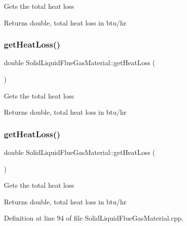 Gets the total heat loss \begin{DoxyReturn}{Returns}
double, total heat loss in btu/hr 
\end{DoxyReturn}
\mbox{\label{class_solid_liquid_flue_gas_material_af7d36673e49f9b5eb631fc04227883d6}} 
\subsubsection{\texorpdfstring{get\+Heat\+Loss()}{getHeatLoss()}\hspace{0.1cm}{\footnotesize\ttfamily [2/3]}}
{\footnotesize\ttfamily double Solid\+Liquid\+Flue\+Gas\+Material\+::get\+Heat\+Loss (\begin{DoxyParamCaption}{ }\end{DoxyParamCaption})}

Gets the total heat loss \begin{DoxyReturn}{Returns}
double, total heat loss in btu/hr 
\end{DoxyReturn}
\mbox{\label{class_solid_liquid_flue_gas_material_af7d36673e49f9b5eb631fc04227883d6}} 
\subsubsection{\texorpdfstring{get\+Heat\+Loss()}{getHeatLoss()}\hspace{0.1cm}{\footnotesize\ttfamily [3/3]}}
{\footnotesize\ttfamily double Solid\+Liquid\+Flue\+Gas\+Material\+::get\+Heat\+Loss (\begin{DoxyParamCaption}{ }\end{DoxyParamCaption})}

Gets the total heat loss \begin{DoxyReturn}{Returns}
double, total heat loss in btu/hr 
\end{DoxyReturn}


Definition at line 94 of file Solid\+Liquid\+Flue\+Gas\+Material.\+cpp.

